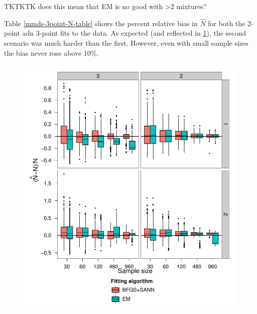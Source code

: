 TKTKTK does this mean that EM is no good with >2 mixtures?

Table \ref{mmds-3point-N-table} shows the percent relative bias in $\hat{N}$ for both the 2-point adn 3-point fits to the data. As expected (and reflected in \ref{mmds-3point-N-boxplots}), the second scenario was much harder than the first. However, even with small sample sizes the bias never rose above 10\%.


\begin{figure}
\centering
\includegraphics[width=6in]{mix/figs/3point-N.pdf}
\caption{}
\label{mmds-3point-N-boxplots}
\end{figure}

